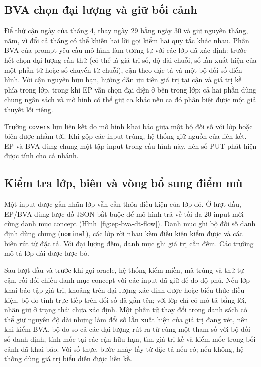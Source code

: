 \subsection{BVA chọn đại lượng và giữ bối cảnh}

Để thử cận ngày của tháng 4, thay ngày 29 bằng ngày 30 và giữ nguyên tháng, năm, vì đổi cả tháng có thể khiến hai lời gọi kiểm hai quy tắc khác nhau. Phần BVA của prompt yêu cầu mô hình làm tương tự với các lớp đã xác định: trước hết chọn đại lượng cần thử (có thể là giá trị số, độ dài chuỗi, số lần xuất hiện của một phần tử hoặc số chuyển từ chuỗi), cận theo đặc tả và một bộ đối số điển hình. Với cận nguyên hữu hạn, hướng dẫn ưu tiên giá trị tại cận và giá trị kề phía trong lớp, trong khi EP vẫn chọn đại diện ở bên trong lớp; cả hai phần dùng chung ngân sách và mô hình có thể giữ ca khác nếu ca đó phân biệt được một giả thuyết lỗi riêng.

Trường \texttt{covers} lưu liên kết do mô hình khai báo giữa một bộ đối số với lớp hoặc biên được nhắm tới. Khi gộp các input trùng, hệ thống giữ nguồn của liên kết. EP và BVA dùng chung một tập input trong cấu hình này, nên số PUT phát hiện được tính cho cả nhánh.

\subsection{Kiểm tra lớp, biên và vòng bổ sung điểm mù}

Một input được gắn nhãn lớp vẫn cần thỏa điều kiện của lớp đó. Ở lượt đầu, EP/BVA dùng lược đồ JSON bắt buộc để mô hình trả về tối đa 20 input mới cùng danh mục concept (Hình~\ref{fig:ep-bva-dt-flow}). Danh mục ghi bộ đối số danh định dùng chung (\texttt{nominal}), các lớp rời nhau kèm điều kiện kiểm được và các biên rút từ đặc tả. Với đại lượng đếm, danh mục ghi giá trị cần đếm. Các trường mô tả lớp dài được lược bỏ.

Sau lượt đầu và trước khi gọi oracle, hệ thống kiểm miền, mã trùng và thứ tự cận, rồi đối chiếu danh mục concept với các input đã giữ để đo độ phủ. Nếu lớp khai báo tập giá trị, khoảng trên đại lượng xác định được hoặc biểu thức điều kiện, bộ đo tính trực tiếp trên đối số đã gắn tên; với lớp chỉ có mô tả bằng lời, nhãn giữ ở trạng thái chưa xác định. Một phần tử thay đổi trong danh sách có thể giữ nguyên độ dài nhưng làm đổi số lần xuất hiện của giá trị đang xét, nên khi kiểm BVA, bộ đo so cả các đại lượng rút ra từ cùng một tham số với bộ đối số danh định, tính mốc tại các cận hữu hạn, tìm giá trị kề và kiểm mốc trong bối cảnh đã khai báo. Với số thực, bước nhảy lấy từ đặc tả nếu có; nếu không, hệ thống dùng giá trị biểu diễn được liền kề.

